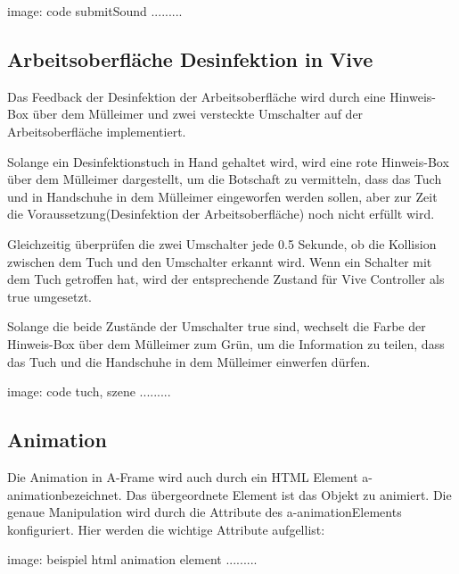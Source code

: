  image: code submitSound .........
 
 \subsection{Arbeitsoberfläche Desinfektion in Vive}
 Das Feedback der Desinfektion der Arbeitsoberfläche wird durch eine Hinweis-Box über dem Mülleimer und zwei versteckte Umschalter auf der Arbeitsoberfläche implementiert.
 
 Solange ein Desinfektionstuch in Hand gehaltet wird, wird eine rote Hinweis-Box über dem Mülleimer dargestellt, um die Botschaft zu vermitteln, dass das Tuch und in Handschuhe in dem Mülleimer eingeworfen werden sollen, aber zur Zeit die Voraussetzung(Desinfektion der Arbeitsoberfläche) noch nicht erfüllt wird.
 
 Gleichzeitig überprüfen die zwei Umschalter jede 0.5 Sekunde, ob die Kollision zwischen dem Tuch und den Umschalter erkannt wird. Wenn ein Schalter mit dem Tuch getroffen hat, wird der entsprechende Zustand für Vive Controller als true umgesetzt.
 
 Solange die beide Zustände der Umschalter true sind, wechselt die Farbe der Hinweis-Box über dem Mülleimer zum Grün, um die Information zu teilen, dass das Tuch und die Handschuhe in dem Mülleimer einwerfen dürfen.
 
 image: code tuch, szene .........
 
 \subsection{Animation}
 Die Animation in A-Frame wird auch durch ein HTML Element \glqq a-animation\grqq bezeichnet. Das übergeordnete Element ist das Objekt zu animiert. Die genaue Manipulation wird durch die Attribute des \glqq a-animation\grqq Elements konfiguriert. Hier werden die wichtige Attribute aufgellist:
 
 image: beispiel html animation element .........
 

